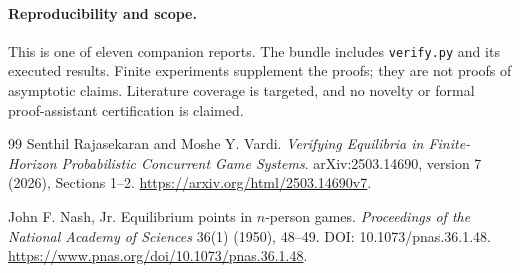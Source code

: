 \documentclass[11pt,a4paper]{article}
\theoremstyle{definition}
\theoremstyle{remark}
\begin{document}
\paragraph{Reproducibility and scope.} This is one of eleven companion reports. The bundle includes \texttt{verify.py} and its executed results. Finite experiments supplement the proofs; they are not proofs of asymptotic claims. Literature coverage is targeted, and no novelty or formal proof-assistant certification is claimed.

\begin{thebibliography}{99}
\small
{}
Senthil Rajasekaran and Moshe Y. Vardi.
\emph{Verifying Equilibria in Finite-Horizon Probabilistic Concurrent Game Systems}.
arXiv:2503.14690, version 7 (2026), Sections 1--2.
\url{https://arxiv.org/html/2503.14690v7}.

John F. Nash, Jr. Equilibrium points in $n$-person games.
\emph{Proceedings of the National Academy of Sciences} 36(1) (1950), 48--49.
DOI: 10.1073/pnas.36.1.48.
\url{https://www.pnas.org/doi/10.1073/pnas.36.1.48}.

\end{thebibliography}
\end{document}
